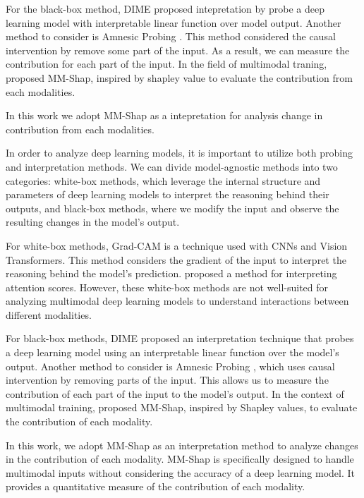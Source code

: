 For the black-box method, DIME \cite{dime} proposed intepretation by probe a deep learning model with interpretable linear function over model output.
Another method to consider is Amnesic Probing \cite{amnesic-probing}.
This method considered the causal intervention by remove some part of the input. 
As a result, we can measure the contribution for each part of the input.
In the field of multimodal traning,  proposed MM-Shap, inspired by shapley value to evaluate the contribution from each modalities.

In this work we adopt MM-Shap as a intepretation for analysis change in contribution from each modalities.

In order to analyze deep learning models, it is important to utilize both probing and interpretation methods. 
We can divide model-agnostic methods into two categories: white-box methods, which leverage the internal structure and parameters of deep learning models to interpret the reasoning behind their outputs, and black-box methods, where we modify the input and observe the resulting changes in the model's output.

For white-box methods, Grad-CAM  is a technique used with CNNs and Vision Transformers. 
This method considers the gradient of the input to interpret the reasoning behind the model’s prediction. 
 proposed a method for interpreting attention scores. 
However, these white-box methods are not well-suited for analyzing multimodal deep learning models to understand interactions between different modalities.

For black-box methods, DIME \cite{dime} proposed an interpretation technique that probes a deep learning model using an interpretable linear function over the model’s output. 
Another method to consider is Amnesic Probing \cite{amnesic-probing}, which uses causal intervention by removing parts of the input. 
This allows us to measure the contribution of each part of the input to the model's output. 
In the context of multimodal training,  proposed MM-Shap, inspired by Shapley values, to evaluate the contribution of each modality.

In this work, we adopt MM-Shap as an interpretation method to analyze changes in the contribution of each modality.
MM-Shap is specifically designed to handle multimodal inputs without considering the accuracy of a deep learning model. 
It provides a quantitative measure of the contribution of each modality.
